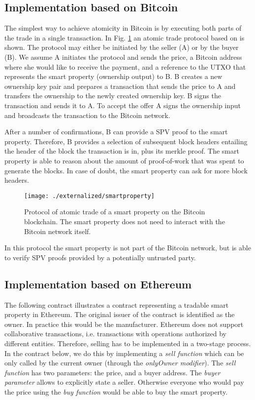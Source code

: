 {\subsection{Implementation based on Bitcoin}

The simplest way to achieve atomicity in Bitcoin is by executing both parts of the trade in a single transaction. In Fig. \ref{fig:smartproperty} an atomic trade protocol based on \cite{smartproperty2011} is shown. The protocol may either be initiated by the seller (A) or by the buyer (B). We assume A initiates the protocol and sends the price, a Bitcoin address where she would like to receive the payment, and a reference to the \ac{UTXO} that represents the smart property (ownership output) to B. B creates a new ownership key pair and prepares a transaction that sends the price to A and transfers the ownership to the newly created ownership key. B signs the transaction and sends it to A. To accept the offer A signs the ownership input and broadcasts the transaction to the Bitcoin network. 

After a number of confirmations, B can provide a \ac{SPV} proof to the smart property. Therefore, B provides a selection of subsequent block headers entailing the header of the block the transaction is in, plus its merkle proof. The smart property is able to reason about the amount of proof-of-work that was spent to generate the blocks. In case of doubt, the smart property can ask for more block headers.

\begin{figure}[!t]
    \centering
    \texttt{[image: ./externalized/smartproperty]}
    \caption{Protocol of atomic trade of a smart property on the Bitcoin blockchain. The smart property does not need to interact with the Bitcoin network itself.}
    \label{fig:smartproperty}
  \end{figure}

In this protocol the smart property is not part of the Bitcoin network, but is able to verify \ac{SPV} proofs provided by a potentially untrusted party. 

\subsection{Implementation based on Ethereum}

The following contract illustrates a contract representing a tradable smart property in Ethereum. The original issuer of the contract is identified as the owner. In practice this would be the manufacturer. Ethereum does not support collaborative transactions, i.e. transactions with operations authorized by different entities. Therefore, selling has to be implemented in a two-stage process. In the contract below, we do this by implementing a \emph{sell function} which can be only called by the current owner (through the \emph{onlyOwner modifier}). The \emph{sell function} has two parameters: the price, and a buyer address. The \emph{buyer parameter} allows to explicitly state a seller. Otherwise everyone who would pay the price using the \emph{buy function} would be able to buy the smart property.

}
